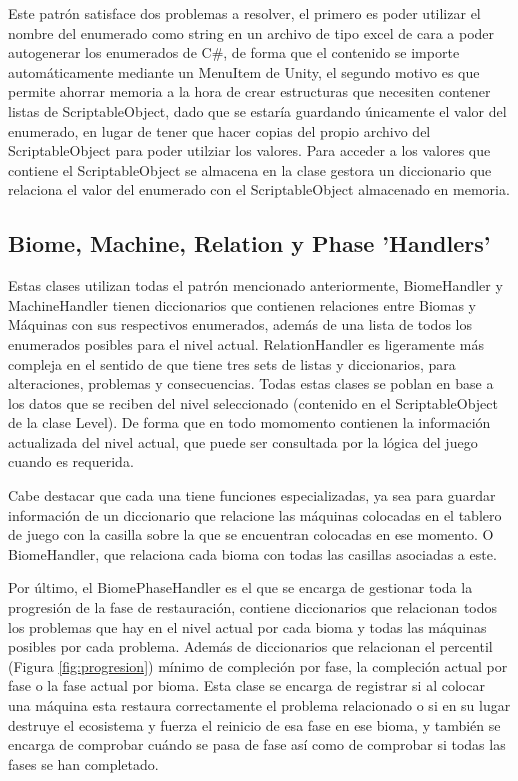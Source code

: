 Este patrón satisface dos problemas a resolver, el primero es poder utilizar el nombre del enumerado como string en un archivo de tipo excel de cara a poder autogenerar los enumerados de C\#, de forma que el contenido se importe automáticamente mediante un MenuItem de Unity, el segundo motivo es que permite ahorrar memoria a la hora de crear estructuras que necesiten contener listas de ScriptableObject, dado que se estaría guardando únicamente el valor del enumerado, en lugar de tener que hacer copias del propio archivo del ScriptableObject para poder utilziar los valores. Para acceder a los valores que contiene el ScriptableObject se almacena en la clase gestora un diccionario que relaciona el valor del enumerado con el ScriptableObject almacenado en memoria. 

\subsection{Biome, Machine, Relation y Phase 'Handlers'}

Estas clases utilizan todas el patrón mencionado anteriormente, BiomeHandler y MachineHandler tienen diccionarios que contienen relaciones entre Biomas y Máquinas con sus respectivos enumerados, además de una lista de todos los enumerados posibles para el nivel actual. RelationHandler es ligeramente más compleja en el sentido de que tiene tres sets de listas y diccionarios, para alteraciones, problemas y consecuencias. Todas estas clases se poblan en base a los datos que se reciben del nivel seleccionado (contenido en el ScriptableObject de la clase Level). De forma que en todo momomento contienen la información actualizada del nivel actual, que puede ser consultada por la lógica del juego cuando es requerida. 

Cabe destacar que cada una tiene funciones especializadas, ya sea para guardar información de un diccionario que relacione las máquinas colocadas en el tablero de juego con la casilla sobre la que se encuentran colocadas en ese momento. O BiomeHandler, que relaciona cada bioma con todas las casillas asociadas a este.

Por último, el BiomePhaseHandler es el que se encarga de gestionar toda la progresión de la fase de restauración, contiene diccionarios que relacionan todos los problemas que hay en el nivel actual por cada bioma y todas las máquinas posibles por cada problema. Además de diccionarios que relacionan el percentil (Figura \ref{fig:progresion}) mínimo de compleción por fase, la compleción actual por fase o la fase actual por bioma. Esta clase se encarga de registrar si al colocar una máquina esta restaura correctamente el problema relacionado o si en su lugar destruye el ecosistema y fuerza el reinicio de esa fase en ese bioma, y también se encarga de comprobar cuándo se pasa de fase así como de comprobar si todas las fases se han completado.

